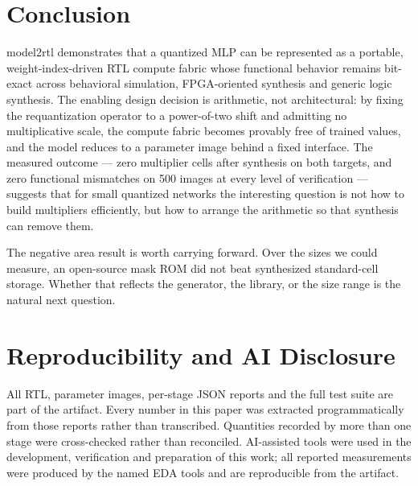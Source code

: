 \documentclass[conference]{IEEEtran}
\begin{document}
\section{Conclusion}

model2rtl demonstrates that a quantized MLP can be represented as a portable,
weight-index-driven RTL compute fabric whose functional behavior remains
bit-exact across behavioral simulation, FPGA-oriented synthesis and generic
logic synthesis. The enabling design decision is arithmetic, not architectural:
by fixing the requantization operator to a power-of-two shift and admitting no
multiplicative scale, the compute fabric becomes provably free of trained
values, and the model reduces to a parameter image behind a fixed interface.
The measured outcome --- zero multiplier cells after synthesis on both targets,
and zero functional mismatches on 500 images at every level of verification ---
suggests that for small quantized networks the interesting question is not how
to build multipliers efficiently, but how to arrange the arithmetic so that
synthesis can remove them.

The negative area result is worth carrying forward. Over the sizes we could
measure, an open-source mask ROM did not beat synthesized standard-cell
storage. Whether that reflects the generator, the library, or the size range is
the natural next question.

\section*{Reproducibility and AI Disclosure}

All RTL, parameter images, per-stage JSON reports and the full test suite are
part of the artifact. Every number in this paper was extracted programmatically
from those reports rather than transcribed. Quantities recorded by more than one
stage were cross-checked rather than reconciled. AI-assisted tools were used in
the development, verification and preparation of this work; all reported
measurements were produced by the named EDA tools and are reproducible from the
artifact.
\end{document}
